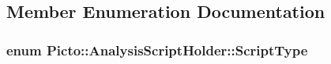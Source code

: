 \subsection{Member Enumeration Documentation}
\hypertarget{class_picto_1_1_analysis_script_holder_adb6ac71422633de2c46dc223551338d8}{
\subsubsection[{Script\-Type}]{\setlength{\rightskip}{0pt plus 5cm}enum {\bf Picto\-::\-Analysis\-Script\-Holder\-::\-Script\-Type}}}\label{class_picto_1_1_analysis_script_holder_adb6ac71422633de2c46dc223551338d8}
